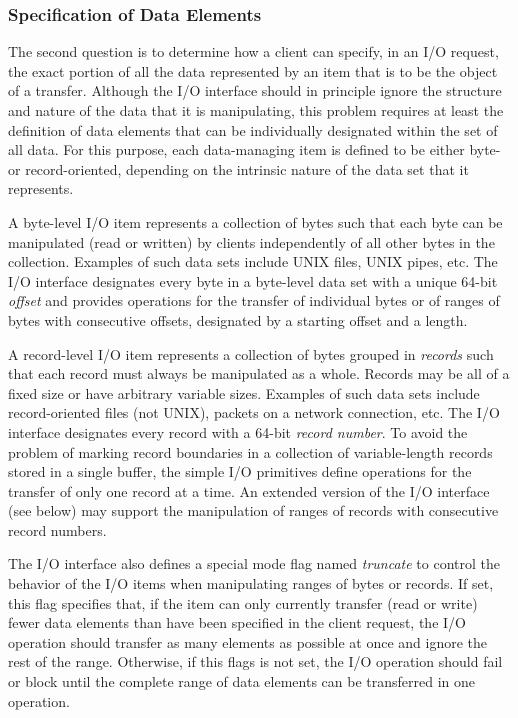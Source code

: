 \subsubsection{Specification of Data Elements}

The second question is to determine how a client can specify, in an
I/O request, the exact portion of all the data represented by an item
that is to be the object of a transfer. Although the I/O interface
should in principle ignore the structure and nature of the data that
it is manipulating, this problem requires at least the definition of
data elements that can be individually designated within the set of
all data. For this purpose, each data-managing item is defined to be
either byte- or record-oriented, depending on the intrinsic nature of
the data set that it represents.

A byte-level I/O item represents a collection of bytes such that each
byte can be manipulated (read or written) by clients independently of
all other bytes in the collection. Examples of such data sets include
UNIX files, UNIX pipes, etc. The I/O interface designates every byte
in a byte-level data set with a unique 64-bit {\em offset} and
provides operations for the transfer of individual bytes or of ranges
of bytes with consecutive offsets, designated by a starting offset and
a length.

A record-level I/O item represents a collection of bytes grouped in
{\em records} such that each record must always be manipulated as a
whole. Records may be all of a fixed size or have arbitrary variable
sizes.  Examples of such data sets include record-oriented files (not
UNIX), packets on a network connection, etc. The I/O interface
designates every record with a 64-bit {\em record number}. To avoid
the problem of marking record boundaries in a collection of
variable-length records stored in a single buffer, the simple I/O
primitives define operations for the transfer of only one record at a
time. An extended version of the I/O interface (see below) may support
the manipulation of ranges of records with consecutive record numbers.

The I/O interface also defines a special mode flag named {\em
truncate} to control the behavior of the I/O items when manipulating
ranges of bytes or records. If set, this flag specifies that, if the
item can only currently transfer (read or write) fewer data elements
than have been specified in the client request, the I/O operation
should transfer as many elements as possible at once and ignore the
rest of the range. Otherwise, if this flags is not set, the I/O
operation should fail or block until the complete range of data
elements can be transferred in one operation.

